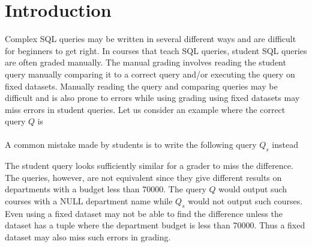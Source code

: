 \section{Introduction}
\label{sec:intro}
Complex SQL queries may be written in several different ways and are difficult for beginners to get right. In courses that teach SQL queries, student SQL queries are often graded manually. The manual grading involves reading the student query manually comparing it to a correct query and/or executing the query on fixed datasets. Manually reading the query and comparing queries may be difficult and is also prone to errors while using grading using fixed datasets may miss errors in student queries. Let us consider an example where the correct query $Q$ is \\
\\
A common mistake made by students is to write the following query $Q_s$ instead\\\tabsql
{}

The student query looks sufficiently similar for a grader to miss the difference. The queries, however, are not equivalent since they give different results on departments with a budget less than 70000. The query $Q$ would output such courses with a NULL department name while $Q_s$ would not output such courses. Even using a fixed dataset may not be able to find the difference unless the dataset has a tuple where the department budget is less than 70000. Thus a fixed dataset may also miss such errors in grading. 

